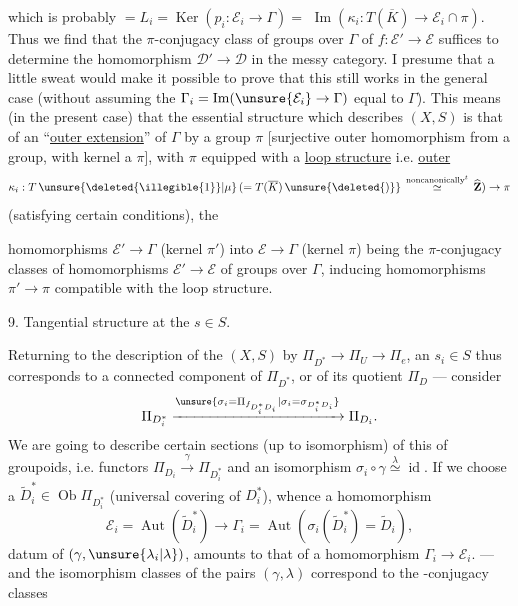 
which is probably $=L_i=\operatorname{Ker}(p_i:\mathcal{E}_i\to\Gamma)=$  $\operatorname{Im}(\kappa_i:T(\overline{K})\to\mathcal{E}_i\cap\pi)$.
Thus we find that  the  $\pi$-conjugacy class of groups over $\Gamma$ of $f:\mathcal{E}'\to\mathcal{E}$ suffices to determine the homomorphism $\mathcal{D}'\to\mathcal{D}$ in the messy category.
I presume that a little sweat would make it possible to prove that this still works in the general case (without assuming the $\Gamma_i=\operatorname{Im}(\unsure{\mathcal{E}_i}\to\Gamma)$ equal to $\Gamma$).
This means (in the present case) that the essential structure which describes $(X,S)$ is that of an  ``\uline{outer extension}'' of $\Gamma$ by a group $\pi$ [surjective outer homomorphism from a group, with kernel a $\pi$], with $\pi$ equipped with a \uline{loop structure} i.e.   \uline{outer}
\[
\kappa_i:T\,\unsure{\text{\deleted{\illegible{1}}}|\mu}\,(=T(\overline{K})\,\unsure{\text{\deleted{)}}}\,\overset{\text{noncanonically}^{t}}{\simeq}\,\widehat{\mathbf{Z}})\to\pi
\]
(satisfying certain conditions), the



homomorphisms  $\mathcal{E}'\to\Gamma$ (kernel $\pi'$) into $\mathcal{E}\to\Gamma$ (kernel $\pi$) being the $\pi$-conjugacy classes of homomorphisms $\mathcal{E}'\to\mathcal{E}$ of groups over $\Gamma$, inducing homomorphisms $\pi'\to\pi$ compatible with the loop structure.

9. Tangential structure at the $s\in S$.

Returning to the  description of the $(X,S)$ by
$\Pi_{D^*}\to\Pi_U\to\Pi_e$, an $s_i\in S$ thus corresponds to a connected component  of $\Pi_{D^*}$, or  of its quotient $\Pi_D$ --- consider
\[
\Pi_{D_i^*}\xrightarrow{\unsure{\sigma_i=\Pi_{f_{D_i^*D_i}}|\sigma_i=\sigma_{D_i^*D_i}}}\Pi_{D_i}.
\]
We are going to describe certain sections (up to isomorphism) of this   of groupoids, i.e.  functors
$\Pi_{D_i}\xrightarrow{\gamma}\Pi_{D_i^*}$ and an isomorphism $\sigma_i\circ\gamma\overset{\lambda}{\simeq}\operatorname{id}$.
If we choose a $\widetilde{D}_i^*\in\operatorname{Ob}\Pi_{D_i^*}$ (universal covering of $D_i^*$), whence a  homomorphism
\[
\mathcal{E}_i=\operatorname{Aut}(\widetilde{D}_i^*)\to\Gamma_i
=\operatorname{Aut}(\sigma_i(\widetilde{D}_i^*)=\widetilde{D}_i),
\]
  datum of $(\gamma,\unsure{\lambda_i|\lambda})$,  amounts to that of a homomorphism $\Gamma_i\to\mathcal{E}_i$.
--- and the isomorphism classes of the pairs $(\gamma,\lambda)$ correspond to the -conjugacy classes

